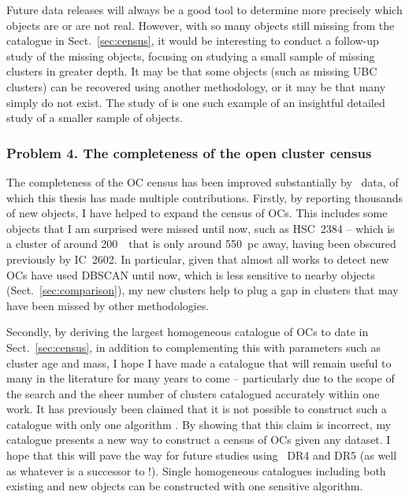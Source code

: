 Future data releases will always be a good tool to determine more precisely which objects are or are not real. However, with so many objects still missing from the catalogue in Sect.~\ref{sec:census}, it would be interesting to conduct a follow-up study of the missing objects, focusing on studying a small sample of missing clusters in greater depth. It may be that some objects (such as missing UBC clusters) can be recovered using another methodology, or it may be that many simply do not exist. The study of \cite{piatti_assessing_2023} is one such example of an insightful detailed study of a smaller sample of objects.


\subsubsection{Problem 4. The completeness of the open cluster census}

The completeness of the OC census has been improved substantially by \gaia\ data, of which this thesis has made multiple contributions. Firstly, by reporting thousands of new objects, I have helped to expand the census of OCs. This includes some objects that I am surprised were missed until now, such as HSC~2384 -- which is a cluster of around 200~\MSun\ that is only around 550~pc away, having been obscured previously by IC~2602. In particular, given that almost all works to detect new OCs have used DBSCAN until now, which is less sensitive to nearby objects (Sect.~\ref{sec:comparison}), my new clusters help to plug a gap in clusters that may have been missed by other methodologies.

Secondly, by deriving the largest homogeneous catalogue of OCs to date in Sect.~\ref{sec:census}, in addition to complementing this with parameters such as cluster age and mass, I hope I have made a catalogue that will remain useful to many in the literature for many years to come -- particularly due to the scope of the search and the sheer number of clusters catalogued accurately within one work. It has previously been claimed that it is not possible to construct such a catalogue with only one algorithm \citep{cantat-gaudin_clusters_2020}. By showing that this claim is incorrect, my catalogue presents a new way to construct a census of OCs given any dataset. I hope that this will pave the way for future studies using \gaia\ DR4 and DR5 (as well as whatever is a successor to \gaia!). Single homogeneous catalogues including both existing and new objects can be constructed with one sensitive algorithm.


